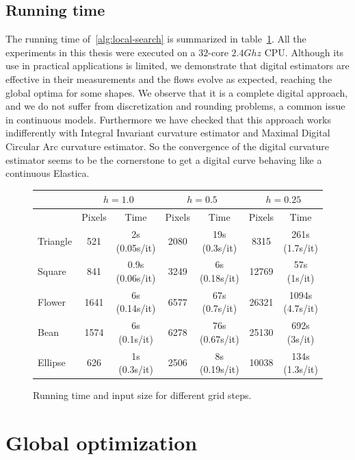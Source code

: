 \subsection{Running time}
\label{ch6:subsec:running-time}

The running time of~\cref{alg:local-search} is summarized in table~\cref{tab:summary-local-comb-rtime}. All the experiments in this thesis were executed on a $32$-core $2.4Ghz$ CPU. Although its use in practical applications is
limited, we demonstrate that digital estimators are effective in their measurements and the flows evolve as expected, reaching the global optima for some shapes. We
observe that it is a complete digital approach, and we do not suffer from discretization and rounding problems, a common
issue in continuous models.  Furthermore we have checked that this approach works indifferently with Integral Invariant
curvature estimator and Maximal Digital Circular Arc curvature estimator. So the convergence of the digital curvature
estimator seems to be the cornerstone to get a digital curve behaving like a continuous Elastica. 

\begin{figure}[h!]
\center
\captionsetup{type=table}
\begin{tabular}{|l|c|c|c|c|c|c|}
\hline
& \multicolumn{2}{c|}{$h=1.0$} & \multicolumn{2}{c|}{$h=0.5$} & \multicolumn{2}{c|}{$h=0.25$}\\
\hline
& Pixels & Time & Pixels & Time & Pixels & Time\\
\hline
Triangle & 521 & 2s (0.05s/it)  & 2080 & 19s (0.3s/it) & 8315 & 261s (1.7s/it)\\
Square & 841 & 0.9s (0.06s/it) & 3249 & 6s (0.18s/it) & 12769 & 57s (1s/it)\\
Flower & 1641 & 6s (0.14s/it) & 6577 & 67s (0.7s/it) & 26321 & 1094s (4.7s/it)\\
Bean  & 1574 & 6s (0.1s/it) & 6278 & 76s (0.67s/it) & 25130 & 692s (3s/it)\\
Ellipse  & 626 & 1s (0.3s/it) & 2506 & 8s (0.19s/it) & 10038 & 134s (1.3s/it)\\
\hline
\end{tabular}
\caption{Running time and input size for different grid steps.}
\label{tab:summary-local-comb-rtime} 
\end{figure}





\section{Global optimization}
\label{ch6:sec:global-optimization}

